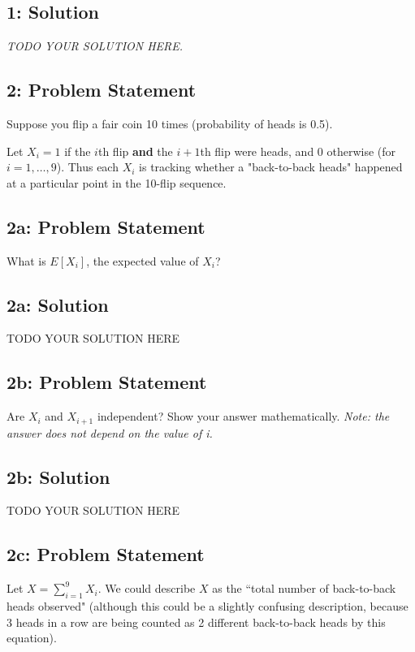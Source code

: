 \documentclass[10pt]{article}
\newcommand{\officialdirections}[1]{{\color{purple} #1}}
\begin{document}
\subsection{1: Solution}

\emph{TODO YOUR SOLUTION HERE.}


\newpage
\officialdirections{
\subsection*{2: Problem Statement}
Suppose you flip a fair coin 10 times (probability of heads is 0.5). 

Let $X_i = 1$ if the $i$th flip \textbf{and} the $i+1$th flip were heads, and 0 otherwise (for $i=1,\dots,9$). Thus each $X_i$ is tracking whether a "back-to-back heads" happened at a particular point in the 10-flip sequence.
}

\officialdirections{\subsection*{2a: Problem Statement}
What is $E[X_i]$, the expected value of $X_i$?
}

\subsection{2a: Solution}
TODO YOUR SOLUTION HERE



\newpage
\officialdirections{\subsection*{2b: Problem Statement}
Are $X_i$ and $X_{i+1}$ independent? Show your answer mathematically. \emph{Note: the answer does not depend on the value of i.}
}

\subsection{2b: Solution}
TODO YOUR SOLUTION HERE

\newpage
\officialdirections{\subsection*{2c: Problem Statement}
Let $X = \sum_{i=1}^9 X_i$. We could describe $X$ as the ``total number of back-to-back heads observed" (although this could be a slightly confusing description, because 3 heads in a row are being counted as 2 different back-to-back heads by this equation). 
}
\end{document}
